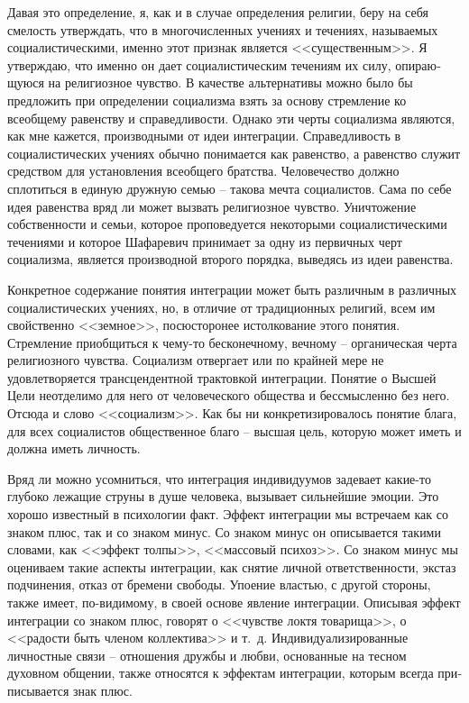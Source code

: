 \documentclass{book}
\begin{document}
Давая это определение, я, как и в случае определения религии, беру на себя смелость утверждать, что в многочисленных учениях и течениях, называемых социалистическими, именно этот признак является <<существенным>>. Я утверждаю, что именно он дает социалистическим течениям их силу, опираю­щуюся на религиозное чувство. В качестве альтернативы можно было бы предложить при определении социализма взять за основу стремление ко всеобщему равенству и справедли­вости. Однако эти черты социализма являются, как мне кажется, производными от идеи интеграции. Справедливость в социалистических учениях обычно понимается как равенство, а равенство служит средством для установления всеобщего братства. Человечество должно сплотиться в единую дружную семью -- такова мечта социалистов. Сама по себе идея равенст­ва вряд ли может вызвать религиозное чувство. Уничтожение собственности и семьи, которое проповедуется некоторыми социалистическими течениями и которое Шафаревич прини­мает за одну из первичных черт социализма, является 
произ­водной второго порядка, выведясь из идеи равенства.

Конкретное содержание понятия интеграции может быть различным в различных социалистических учениях, но, в отли­чие от традиционных религий, всем им свойственно <<земное>>, посюсторонее истолкование этого понятия. Стремление приоб­щиться к чему-то бесконечному, вечному -- органическая чер­та религиозного чувства. Социализм отвергает или по край­ней мере не удовлетворяется трансцендентной трактовкой ин­теграции. Понятие о Высшей Цели неотделимо для него от че­ловеческого общества и бессмысленно без него. Отсюда и слово <<социализм>>. Как бы ни конкретизировалось понятие блага, для всех социалистов общественное благо -- высшая цель, ко­торую может иметь и должна иметь личность.

Вряд ли можно усомниться, что интеграция индивидуумов задевает какие-то глубоко лежащие струны в душе человека, вызывает сильнейшие эмоции. Это хорошо известный в психо­логии факт. Эффект интеграции мы встречаем как со знаком плюс, так и со знаком минус. Со знаком минус он описывает­ся такими словами, как <<эффект толпы>>, <<массовый психоз>>. Со знаком минус мы оцениваем такие аспекты интеграции, как снятие личной ответственности, экстаз подчинения, отказ от бремени свободы. Упоение властью, с другой стороны, также имеет, по-видимому, в своей основе явление интеграции. Опи­сывая эффект интеграции со знаком плюс, говорят о <<чувст­ве локтя товарища>>, о <<радости быть членом коллектива>> и т.~д. Индивидуализированные личностные связи -- отношения дружбы и любви, основанные на тесном духовном общении, также относятся к эффектам интеграции, которым всегда при­писывается знак плюс.
\end{document}
